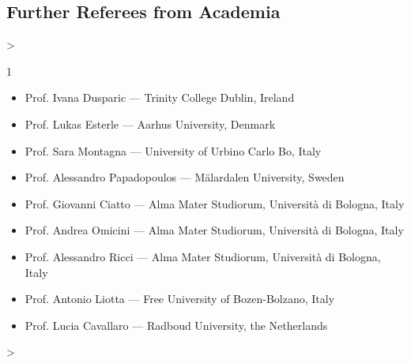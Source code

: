 \documentclass[10pt,a4paper,roman]{moderncv}        %
\makeatletter
\newenvironment{cvprose}%
  {\begin{list}{}{%
     \setlength{\leftmargin}{\dimexpr\hintscolumnwidth+\separatorcolumnwidth\relax}%
     \setlength{\rightmargin}{0pt}%
     \setlength{\listparindent}{0pt}%
     \setlength{\itemindent}{0pt}%
     \setlength{\labelwidth}{0pt}%
     \setlength{\topsep}{.25em}%
     \setlength{\parsep}{.5em}%
     \setlength{\partopsep}{0pt}}%
   \item\relax}%
  {\end{list}}
\newenvironment{cvlist}[1][2]%
  {\begin{cvprose}%
   \cvlist@cols=#1\relax
   \setlength{\multicolsep}{0pt}%
   \setlength{\columnsep}{1.2em}%
   \setlength{\columnwidth}{\linewidth}%
   \ifnum\cvlist@cols>\@ne\begin{multicols}{#1}\fi
   \begin{itemize}%
     \setlength{\itemsep}{.1ex}%
     \setlength{\parskip}{0pt}%
     \setlength{\topsep}{0pt}}%
  {\end{itemize}%
   \ifnum\cvlist@cols>\@ne\end{multicols}\fi
   \end{cvprose}}
\newcommand{\cvsection}[1]{\Needspace{6\baselineskip}\section{#1}}
\newcommand{\cvsubsection}[1]{\Needspace{4\baselineskip}\subsection{#1}}
\makeatother
\begin{document}
\cvsubsection{Further Referees from Academia}
\begin{cvlist}[1]
  \item Prof. Ivana Dusparic --- Trinity College Dublin, Ireland
  \item Prof. Lukas Esterle --- Aarhus University, Denmark
  \item Prof. Sara Montagna --- University of Urbino Carlo Bo, Italy 
  \item Prof. Alessandro Papadopoulos --- Mälardalen University, Sweden
  \item Prof. Giovanni Ciatto --- Alma Mater Studiorum, Università di Bologna, Italy
  \item Prof. Andrea Omicini --- Alma Mater Studiorum, Università di Bologna, Italy
  \item Prof. Alessandro Ricci --- Alma Mater Studiorum, Università di Bologna, Italy
  \item Prof. Antonio Liotta --- Free University of Bozen-Bolzano, Italy
  \item Prof. Lucia Cavallaro --- Radboud University, the Netherlands
\end{cvlist}



\end{document}
